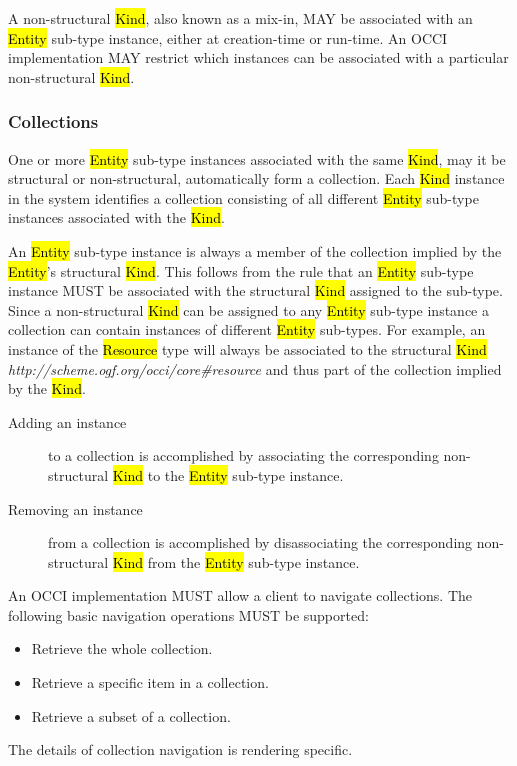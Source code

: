 \documentclass[10pt,a4paper,british]{article}
\begin{document}
A non-structural \hl{Kind}, also known as a mix-in, MAY be associated with an
\hl{Entity} sub-type instance, either at creation-time or run-time. An OCCI
implementation MAY restrict which instances can be associated with a particular
non-structural \hl{Kind}.

\subsubsection{Collections}
\label{sec:collection}
One or more \hl{Entity} sub-type instances associated with the same \hl{Kind},
may it be structural or non-structural, automatically form a collection.
Each \hl{Kind} instance in the system identifies a collection consisting of all
different \hl{Entity} sub-type instances associated with the \hl{Kind}.

An \hl{Entity} sub-type instance is always a member of the collection implied
by the \hl{Entity}'s structural \hl{Kind}. This follows from the rule that an
\hl{Entity} sub-type instance MUST be associated with the structural \hl{Kind}
assigned to the sub-type.
Since a non-structural \hl{Kind} can be assigned to any \hl{Entity} sub-type
instance a collection can contain instances of different \hl{Entity} sub-types.
%
For example, an instance of the \hl{Resource} type will always be associated
to the structural \hl{Kind}
\textit{http://scheme.ogf.org/occi/core\#resource} and thus part of the
collection implied by the \hl{Kind}.
\begin{description}
\item[Adding an instance] to a collection is accomplished by associating the
corresponding non-structural \hl{Kind} to the \hl{Entity} sub-type instance.
\item[Removing an instance] from a collection is accomplished by disassociating the
corresponding non-structural \hl{Kind} from the \hl{Entity} sub-type instance.
\end{description}
%
An OCCI implementation MUST allow a client to navigate collections. The
following basic navigation operations MUST be supported:
\begin{itemize}
\item Retrieve the whole collection.
\item Retrieve a specific item in a collection.
\item Retrieve a subset of a collection.
\end{itemize}
The details of collection navigation is rendering specific.
\end{document}
